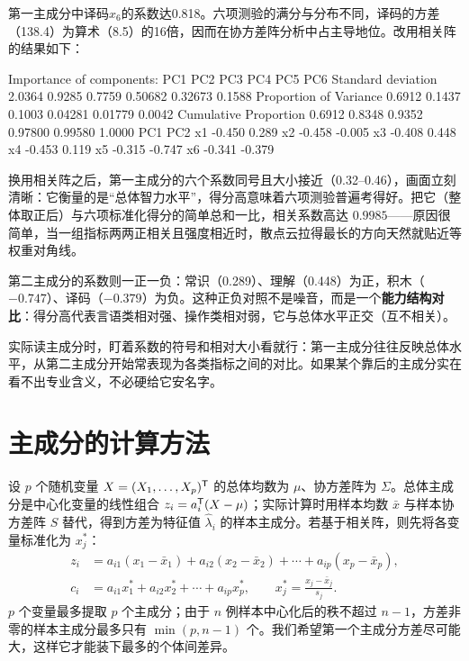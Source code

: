 第一主成分中译码$x_6$的系数达0.818。六项测验的满分与分布不同，译码的方差（138.4）为算术（8.5）的16倍，因而在协方差阵分析中占主导地位。改用相关阵的结果如下：
\par\noindent{}
\begin{routput}
Importance of components:
                          PC1    PC2    PC3     PC4     PC5    PC6
Standard deviation     2.0364 0.9285 0.7759 0.50682 0.32673 0.1588
Proportion of Variance 0.6912 0.1437 0.1003 0.04281 0.01779 0.0042
Cumulative Proportion  0.6912 0.8348 0.9352 0.97800 0.99580 1.0000
      PC1    PC2
x1 -0.450  0.289
x2 -0.458 -0.005
x3 -0.408  0.448
x4 -0.453  0.119
x5 -0.315 -0.747
x6 -0.341 -0.379
\end{routput}
\begin{sikao}
换用相关阵之后，第一主成分的六个系数同号且大小接近（0.32--0.46），画面立刻清晰：它衡量的是“总体智力水平”，得分高意味着六项测验普遍考得好。把它（整体取正后）与六项标准化得分的简单总和一比，相关系数高达 $0.9985$——原因很简单，当一组指标两两正相关且强度相近时，散点云拉得最长的方向天然就贴近等权重对角线。

第二主成分的系数则一正一负：常识（0.289）、理解（0.448）为正，积木（$-0.747$）、译码（$-0.379$）为负。这种正负对照不是噪音，而是一个\textbf{能力结构对比}：得分高代表言语类相对强、操作类相对弱，它与总体水平正交（互不相关）。

实际读主成分时，盯着系数的符号和相对大小看就行：第一主成分往往反映总体水平，从第二主成分开始常表现为各类指标之间的对比。如果某个靠后的主成分实在看不出专业含义，不必硬给它安名字。
\end{sikao}
\section{主成分的计算方法}
设 $p$ 个随机变量 $X=(X_1,\ldots,X_p)^{\mathsf T}$ 的总体均数为 $\mu$、协方差阵为 $\Sigma$。总体主成分是中心化变量的线性组合 $z_i=a_i^{\mathsf T}(X-\mu)$；实际计算时用样本均数 $\bar x$ 与样本协方差阵 $S$ 替代，得到方差为特征值 $\widehat\lambda_i$ 的样本主成分。若基于相关阵，则先将各变量标准化为 $x_j^*$：
\begin{align}
z_i&=a_{i1}(x_1-\bar x_1)+a_{i2}(x_2-\bar x_2)+\cdots+a_{ip}(x_p-\bar x_p),\\
c_i&=a_{i1}x_1^*+a_{i2}x_2^*+\cdots+a_{ip}x_p^*,\qquad x_j^*=\frac{x_j-\bar x_j}{s_j}.
\end{align}
$p$ 个变量最多提取 $p$ 个主成分；由于 $n$ 例样本中心化后的秩不超过 $n-1$，方差非零的样本主成分最多只有 $\min(p,n-1)$ 个。我们希望第一个主成分方差尽可能大，这样它才能装下最多的个体间差异。
